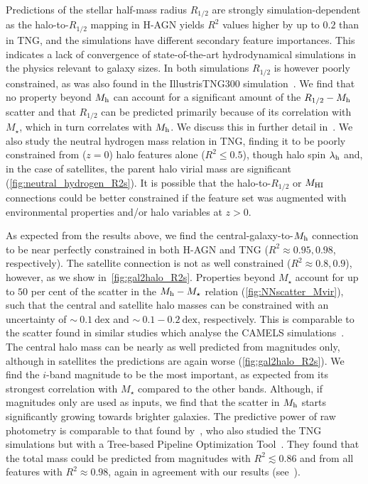 \documentclass[usenatbib,useAMS]{mnras}
\begin{document}
Predictions of the stellar half-mass radius $R_{1/2}$ are strongly simulation-dependent as the halo-to-$R_{1/2}$ mapping in H-AGN yields $R^2$ values higher by up to $0.2$ than in TNG, and the simulations have different secondary feature importances. This indicates a lack of convergence of state-of-the-art hydrodynamical simulations in the physics relevant to galaxy sizes. In both simulations $R_{1/2}$ is however poorly constrained, as was also found in the IllustrisTNG300 simulation~\citep{de_Santi_2022}. We find that no property beyond $M_{\rm h}$ can account for a significant amount of the $R_{1/2} - M_{\rm h}$ scatter and that $R_{1/2}$ can be predicted primarily because of its correlation with $M_{\star}$, which in turn correlates with $M_{\rm h}$. We discuss this in further detail in~. We also study the neutral hydrogen mass relation in TNG, finding it to be poorly constrained from ($z=0$) halo features alone ($R^2 \leq 0.5$), though halo spin $\lambda_{\rm h}$ and, in the case of satellites, the parent halo virial mass are significant (\cref{fig:neutral_hydrogen_R2s}). It is possible that the halo-to-$R_{1/2}$ or $M_{\rm HI}$ connections could be better constrained if the feature set was augmented with environmental properties and/or halo variables at $z>0$.

As expected from the results above, we find the central-galaxy-to-$M_{\rm h}$ connection to be near perfectly constrained in both H-AGN and TNG ($R^2 \approx 0.95, 0.98$, respectively). The satellite connection is not as well constrained ($R^2 \approx 0.8, 0.9$), however, as we show in~\cref{fig:gal2halo_R2s}. Properties beyond $M_\star$ account for up to $50$ per cent of the scatter in the $M_{\rm h} - M_\star$ relation (\cref{fig:NNscatter_Mvir}), such that the central and satellite halo masses can be constrained with an uncertainty of $\sim~0.1~\mathrm{dex}$ and $\sim~0.1-0.2~\mathrm{dex}$, respectively. This is comparable to the scatter found in similar studies which analyse the CAMELS simulations~\citep{Villanueva_Domingo_2021,Shao_2021}. The central halo mass can be nearly as well predicted from magnitudes only, although in satellites the predictions are again worse (\cref{fig:gal2halo_R2s}). We find the $i$-band magnitude to be the most important, as expected from its strongest correlation with $M_\star$ compared to the other bands. Although, if magnitudes only are used as inputs, we find that the scatter in $M_{\rm h}$ starts significantly growing towards brighter galaxies. The predictive power of raw photometry is comparable to that found by~\cite{vonMarttens_2021}, who also studied the TNG simulations but with a Tree-based Pipeline Optimization Tool~\citep{Olson_2016}. They found that the total mass could be predicted from magnitudes with $R^2 \lesssim0.86$ and from all features with $R^2 \approx 0.98$, again in agreement with our results (see~).
\end{document}
